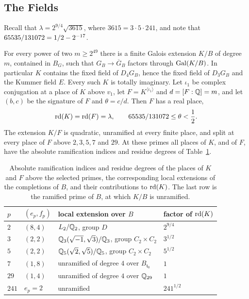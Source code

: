 \subsection{The Fields}\label{tw:fields-section}
Recall that $\lambda=2^{9/4}\sqrt{3615}$, where $3615=3\cdot5\cdot241$, and
note that $65535/131072=1/2-2^{-17}$.

\begin{theorem}\label{tw:field-family}
For every power of two $m\ge2^{49}$ there is a finite Galois extension
$K/B$ of degree $m$, contained in $B_G$, such that $G_B\to\overline G_B$
factors through $\operatorname{Gal}(K/B)$. In particular $K$ contains the fixed field of
$D_4G_B$, hence the fixed field of $D_3G_B$ and the Kummer field $E$. Every
such $K$ is totally imaginary. Let $\iota_1$ be complex conjugation at a
place of $K$ above $v_1$, let $F=K^{\langle\iota_1\rangle}$ and
$d=[F:\mathbb Q]=m$, and let $(b,c)$ be the signature of $F$ and $\theta=c/d$. Then
$F$ has a real place,
\[
 \operatorname{rd}(K)=\operatorname{rd}(F)=\lambda,\qquad 65535/131072\le\theta<\frac12 .
\]
The extension $K/F$ is quadratic, unramified at every finite place, and
split at every place of $F$ above $2,3,5,7$ and $29$. At these primes all
places of $K$, and of $F$, have the absolute ramification indices and residue
degrees of Table~\ref{tw:types-table}.
\end{theorem}

\begin{table}[htbp]
\centering
\caption{Absolute ramification indices and residue degrees of the places of
$K$ and $F$ above the selected primes, the corresponding local extensions of
the completions of $B$, and their contributions to $\operatorname{rd}(K)$. The last row is
the ramified prime of $B$, at which $K/B$ is unramified.}
\label{tw:types-table}
\begin{tabular}{llll}
\toprule
$p$ & $(e_p,f_p)$ & local extension over $B$ & factor of $\operatorname{rd}(K)$\\
\midrule
$2$ & $(8,4)$ & $L_2/\mathbb Q_2$, group $D$ & $2^{9/4}$\\
$3$ & $(2,2)$ & $\mathbb Q_3(\sqrt{-1},\sqrt3)/\mathbb Q_3$, group $C_2\times C_2$ & $3^{1/2}$\\
$5$ & $(2,2)$ & $\mathbb Q_5(\sqrt2,\sqrt5)/\mathbb Q_5$, group $C_2\times C_2$ & $5^{1/2}$\\
$7$ & $(1,8)$ & unramified of degree $4$ over $B_{\mathfrak t_0}$ & $1$\\
$29$ & $(1,4)$ & unramified of degree $4$ over $\mathbb Q_{29}$ & $1$\\
\midrule
$241$ & $e_p=2$ & unramified & $241^{1/2}$\\
\bottomrule
\end{tabular}
\end{table}

